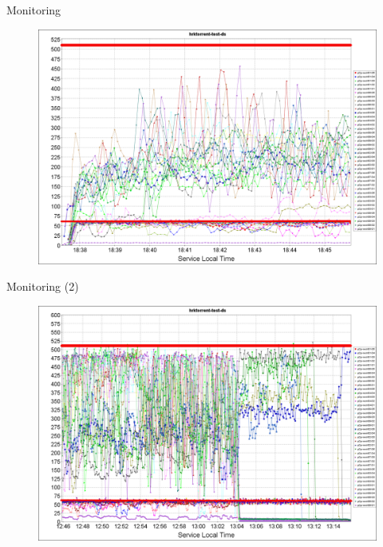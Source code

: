 \documentclass{beamer}
\begin{document}
\begin{frame}{Monitoring}
  \begin{figure}
    \includegraphics[scale=0.15]{img/test-monalisa-virt-env-start}
  \end{figure}
\end{frame}

\begin{frame}{Monitoring (2)}
  \begin{figure}
    \includegraphics[scale=0.15]{img/test-monalisa-virt-env-stop}
  \end{figure}
\end{frame}
\end{document}
